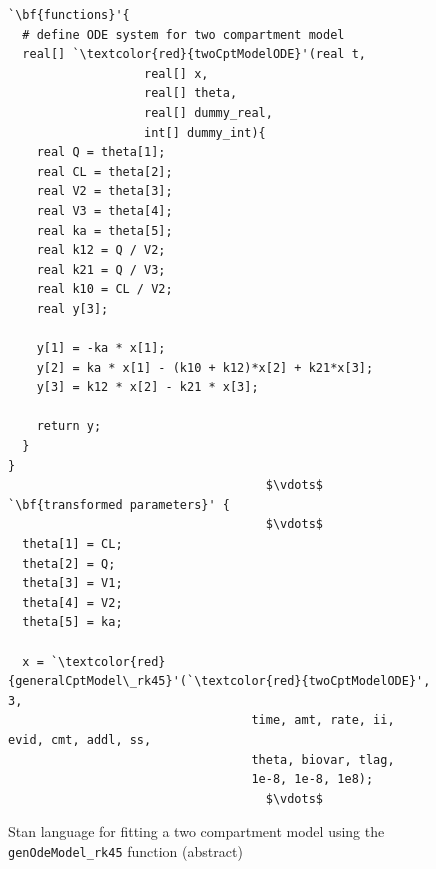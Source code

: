 \documentclass[11pt]{amsart}
\newenvironment{fmpage}[1]
     {\begin{lrbox}{\fmbox}\begin{minipage}{#1}}
     {\end{minipage}\end{lrbox}\fbox{\usebox{\fmbox}}}
\begin{document}
\begin{figure}
\caption{Stan language for fitting a two compartment model using the \texttt{genOdeModel\_rk45} function (abstract)}
\begin{center}
\begin{small}
\begin{fmpage}{\textwidth - .75in}
\begin{lstlisting}[basicstyle=\footnotesize\ttfamily,mathescape=true,flexiblecolumns=true,frame=single,escapeinside=`']
`\bf{functions}'{
  # define ODE system for two compartment model
  real[] `\textcolor{red}{twoCptModelODE}'(real t,
			       real[] x,
			       real[] theta,
			       real[] dummy_real,
			       int[] dummy_int){
    real Q = theta[1];
    real CL = theta[2];
    real V2 = theta[3];
    real V3 = theta[4];
    real ka = theta[5];
    real k12 = Q / V2;
    real k21 = Q / V3;
    real k10 = CL / V2;
    real y[3]; 

    y[1] = -ka * x[1];
    y[2] = ka * x[1] - (k10 + k12)*x[2] + k21*x[3];
    y[3] = k12 * x[2] - k21 * x[3];

    return y;
  }
}
                                    $\vdots$
`\bf{transformed parameters}' {
                                    $\vdots$
  theta[1] = CL;
  theta[2] = Q;
  theta[3] = V1;
  theta[4] = V2;
  theta[5] = ka;

  x = `\textcolor{red}{generalCptModel\_rk45}'(`\textcolor{red}{twoCptModelODE}', 3,
                                  time, amt, rate, ii, evid, cmt, addl, ss,
                                  theta, biovar, tlag, 
                                  1e-8, 1e-8, 1e8);
                                    $\vdots$
\end{lstlisting}
\end{fmpage}
\end{small}
\end{center}
\label{GenTwoCptModelCode}
\end{figure}
\end{document}
